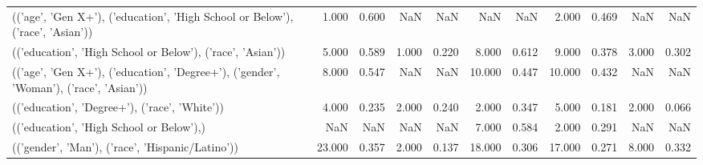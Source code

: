 \begin{tabular}{lrrrrrrrrrr}
(('age', 'Gen X+'), ('education', 'High School or Below'), ('race', 'Asian')) & 1.000 & 0.600 & NaN & NaN & NaN & NaN & 2.000 & 0.469 & NaN & NaN \\
(('education', 'High School or Below'), ('race', 'Asian')) & 5.000 & 0.589 & 1.000 & 0.220 & 8.000 & 0.612 & 9.000 & 0.378 & 3.000 & 0.302 \\
(('age', 'Gen X+'), ('education', 'Degree+'), ('gender', 'Woman'), ('race', 'Asian')) & 8.000 & 0.547 & NaN & NaN & 10.000 & 0.447 & 10.000 & 0.432 & NaN & NaN \\
(('education', 'Degree+'), ('race', 'White')) & 4.000 & 0.235 & 2.000 & 0.240 & 2.000 & 0.347 & 5.000 & 0.181 & 2.000 & 0.066 \\
(('education', 'High School or Below'),) & NaN & NaN & NaN & NaN & 7.000 & 0.584 & 2.000 & 0.291 & NaN & NaN \\
(('gender', 'Man'), ('race', 'Hispanic/Latino')) & 23.000 & 0.357 & 2.000 & 0.137 & 18.000 & 0.306 & 17.000 & 0.271 & 8.000 & 0.332 \\
\bottomrule
\end{tabular}
